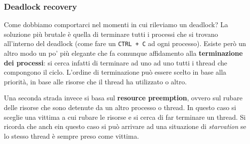 \subsubsection{Deadlock recovery}\label{recovery}
Come dobbiamo comportarci nel momenti in cui rileviamo un deadlock? La soluzione più brutale è quella di terminare tutti i processi che si trovano all'interno del deadlock (come fare un \texttt{CTRL + C} ad ogni processo). Esiste però un altro modo un po' più elegante che fa comunque affidamento alla \textbf{terminazione dei processi}: si cerca infatti di terminare ad uno ad uno tutti i thread che compongono il ciclo. L'ordine di terminazione può essere scelto in base alla priorità, in base alle risorse che il thread ha utilizzato o altro.

Una seconda strada invece si basa sul \textbf{resource preemption}, ovvero sul rubare delle risorse che sono detenute da un altro processo o thread. In questo caso si sceglie una vittima a cui rubare le risorse e si cerca di far terminare un thread. Si ricorda che anch ein questo caso si può arrivare ad una situazione di \textit{starvation} se lo stesso thread è sempre preso come vittima.
